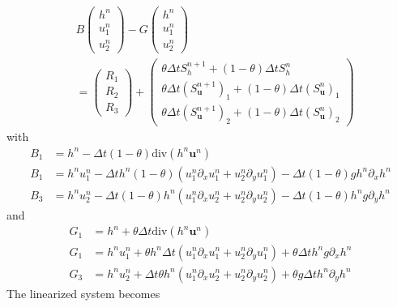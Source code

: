 \documentclass[a4paper, 11pt]{article}
\begin{document}
\begin{equation*}
\begin{split}
&B\begin{pmatrix}h^n\\u_1^n\\u_2^n\end{pmatrix}-G\begin{pmatrix}h^{n}\\u_1^{n}\\u_2^{n}\end{pmatrix}\\
&=\begin{pmatrix} R_{1}\\
 R_{2}\\
 R_{3}\end{pmatrix}
 +\begin{pmatrix}\theta \Delta tS_h^{n+1}+(1-\theta)\Delta tS_h^{n}\\ \theta \Delta t\left(S_{\boldsymbol{u}}^{n+1}\right)_1+(1-\theta)\Delta t\left(S_{\boldsymbol{u}}^n\right)_1\\ \theta \Delta t\left(S_{\boldsymbol{u}}^{n+1}\right)_2+(1-\theta)\Delta t\left(S_{\boldsymbol{u}}^n\right)_2\end{pmatrix}
\end{split}
\end{equation*}
with
\begin{align*}
B_{1} &= h^n-\Delta t(1-\theta)\text{div}(h^n\boldsymbol{u}^n)\\
B_{1} & = h^nu_1^n-\Delta th^n(1-\theta)(u_1^n\partial_xu_1^n+u_2^n\partial_yu_1^n)-\Delta t(1-\theta)gh^n\partial_xh^n\\
B_{3} & = h^nu_2^n-\Delta t(1-\theta)h^n(u_1^n\partial_xu_2^n+u_2^n\partial_yu_2^n)-\Delta t(1-\theta)h^ng\partial_yh^n
\end{align*}
and
\begin{align*}
G_{1} &= h^n+\theta\Delta t\text{div}(h^n\boldsymbol{u}^n) \\
G_{1} & = h^nu_1^n+\theta h^n\Delta t(u_1^n\partial_xu_1^n+u_2^n\partial_yu_1^n)+\theta\Delta th^ng\partial_xh^n\\
G_{3} & = h^nu_2^n+\Delta t\theta h^n(u_1^n\partial_xu_2^n+u_2^n\partial_yu_2^n)+\theta g\Delta th^n\partial_yh^n
\end{align*}
The linearized system becomes
\end{document}

